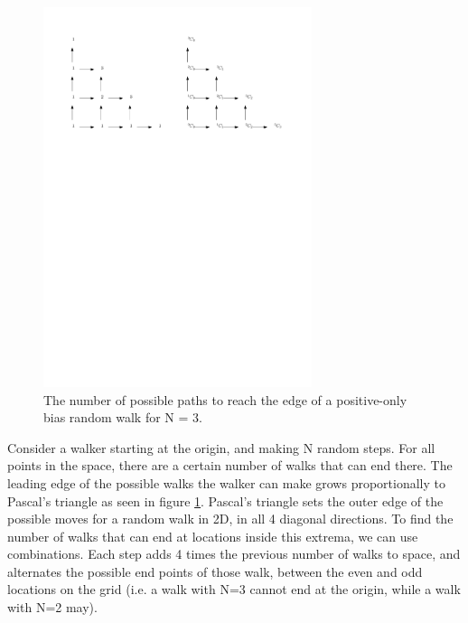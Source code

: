 		\begin{figure}[htpb]
		\centering
		\includegraphics[width = 0.7\textwidth]{figs/walkedge.pdf}
		\caption{The number of possible paths to reach the edge of a positive-only bias random walk for N = 3.}
		\label{fig:randomwalkedge}
		\end{figure}
		
	Consider a walker starting at the origin, and making N random steps. For all points in the space, there are a certain number of walks that can end there. The leading edge of the possible walks the walker can make grows proportionally to Pascal's triangle as seen in figure \ref{fig:randomwalkedge}. Pascal's triangle sets the outer edge of the possible moves for a random walk in 2D, in all 4 diagonal directions. To find the number of walks that can end at locations inside this extrema, we can use combinations. Each step adds 4 times the previous number of walks to space, and alternates the possible end points of those walk, between the even and odd locations on the grid (i.e. a walk with N=3 cannot end at the origin, while a walk with N=2 may).  
		


